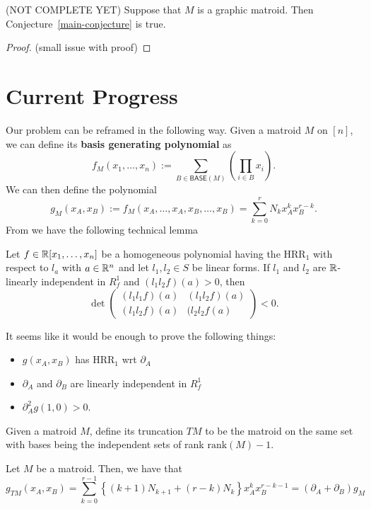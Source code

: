 \documentclass[12pt]{article}
\begin{document}
\begin{thm}
	(NOT COMPLETE YET) Suppose that $M$ is a graphic matroid. Then Conjecture~\ref{main-conjecture} is true.
\end{thm}
\begin{proof}
	(small issue with proof) 
\end{proof}

\section{Current Progress}

Our problem can be reframed in the following way. Given a matroid $M$ on $[n]$, we can define its \textbf{basis generating polynomial} as 
\[
	f_M (x_1, \ldots, x_n) := \sum_{B \in \mathsf{BASE}(M)} \left ( \prod_{i \in B} x_i \right ). 
\]
We can then define the polynomial
\[
	g_M (x_A, x_B) := f_M(x_A, \ldots, x_A, x_B, \ldots, x_B) = \sum_{k = 0}^r N_k x_A^k x_B^{r-k}.
\]
From \cite{MNY} we have the following technical lemma
\begin{lem}
	Let $f \in \mathbb{R}[x_1, \ldots, x_n]$ be a homogeneous polynomial having the $\text{HRR}_1$ with respect to $l_a$ with $a \in \mathbb{R}^n$ and let $l_1, l_2 \in S$ be linear forms. If $l_1$ and $l_2$ are $\mathbb{R}$-linearly independent in $R_f^1$ and $(l_1l_2f)(a) > 0$, then 
	\[
		\det \begin{pmatrix}
			(l_1l_1f)(a) & (l_1l_2f)(a) \\
			(l_1l_2f)(a) & (l_2l_2f(a)
		\end{pmatrix} < 0.
	\]
\end{lem}

It seems like it would be enough to prove the following things:
\begin{itemize}
	\item $g(x_A, x_B)$ has $\text{HRR}_1$ wrt $\partial_A$
	\item $\partial_A$ and $\partial_B$ are linearly independent in $R_f^1$
	\item $\partial_A^2 g (1, 0) > 0$. 
\end{itemize}

Given a matroid $M$, define its truncation $TM$ to be the matroid on the same set with bases being the independent sets of rank $\text{rank}(M) - 1$. 

\begin{prop}
	Let $M$ be a matroid. Then, we have that 
	\[
		g_{TM} (x_A, x_B) = \sum_{k = 0}^{r-1} \left \{ (k+1)N_{k+1} + (r-k) N_k\right \} x_A^k x_B^{r-k-1} = (\partial_A + \partial_B) g_M
	\]
\end{prop}
\end{document}
